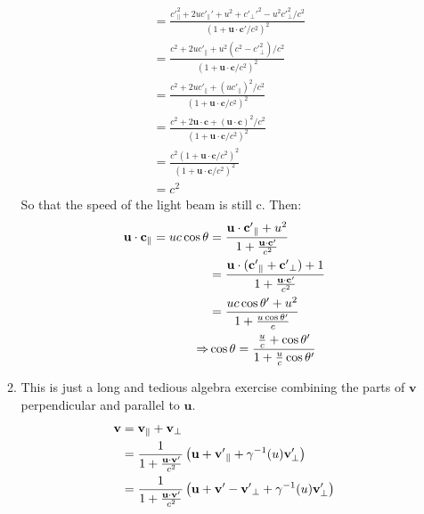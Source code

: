 \documentclass[12pt,a4]{article}
\begin{document}
\begin{enumerate}
\begin{enumerate}
\begin{align*}
                                                      &= \frac{{c'}_\parallel^2 + 2 u {c'}_\parallel' + u^2 + {c'}_\perp'^2 - u^2 {c'}_\perp^2/ c^2}{(1 + \mathbf{u} \cdot \mathbf{c'}/c^2)^2}\\
                                                       &= \frac{c^2 + 2 u {c'}_\parallel + u^2(c^2 - {c'}_\perp^2)/ c^2}{(1 + \mathbf{u} \cdot \mathbf{c}/c^2)^2}\\
                                                       &= \frac{c^2 + 2 u {c'}_\parallel + (u{c'}_\parallel)^2/ c^2}{(1 + \mathbf{u} \cdot \mathbf{c}/c^2)^2}\\
                                                       &= \frac{c^2 + 2\mathbf{u} \cdot \mathbf{c}  + (\mathbf{u} \cdot \mathbf{c})^2/ c^2}{(1 + \mathbf{u} \cdot \mathbf{c}/c^2)^2}\\
                                                       &= \frac{c^2 (1 + \mathbf{u} \cdot \mathbf{c}/c^2)^2}{(1 + \mathbf{u} \cdot \mathbf{c}/c^2)^2}\\
                                                       &= c^2
        \end{align*}
        So that the speed of the light beam is still c.
        Then:
        \begin{align*}
          {\bf u} \cdot {\bf c}_\parallel  = u c \cos \theta & = \frac{{\bf u} \cdot {\bf c'}_\parallel + u^2}{1 + \frac{{\bf u} \cdot {\bf c'}}{c^2}}\\
                                                             & = \frac{{\bf u} \cdot ({\bf c'}_\parallel + {\bf c'}_\perp) + 1}{1 + \frac{{\bf u} \cdot {\bf c'}}{c^2}}\\
                                                  & = \frac{uc \cos \theta ' + u^2}{1 + \frac{u \cos \theta '}{c}}\\
                                      \Rightarrow &\cos\theta = \frac{\frac{u}{c} + \cos \theta '}{1 + \frac{u}{c} \cos\theta ' }
        \end{align*}
      \item
        This is just a long and tedious algebra exercise combining the parts of $\mathbf{v}$ perpendicular and parallel to $\mathbf{u}$.
        \begin{align*}
          {\bf v} &= {\bf v}_\parallel + {\bf v}_\perp\\
                  &= \frac{1}{1 + \frac{{\bf u} \cdot {\bf v}'}{c^2}} \left( {\bf u} + {\bf v'}_\parallel + \gamma^{-1}(  u) {\bf v}'_\perp\right)\\
                  &= \frac{1}{1 + \frac{{\bf u} \cdot {\bf v}'}{c^2}} \left( {\bf u} + {\bf v'} - {\bf v'}_\perp + \gamma^{-1}(  u) {\bf v}'_\perp\right)\\

\end{align*}
\end{enumerate}
\end{enumerate}
\end{document}
